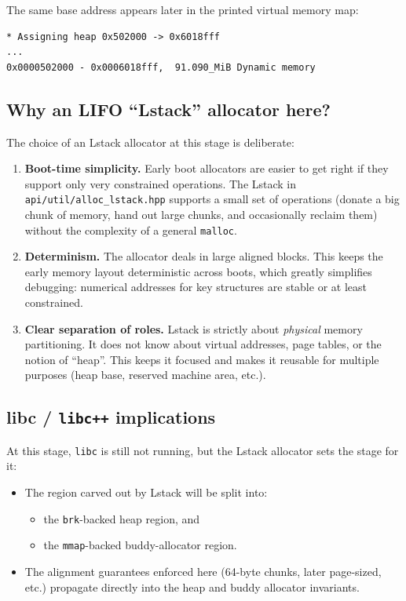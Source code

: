\documentclass[a4paper,11pt]{article}
\begin{document}
The same base address appears later in the printed virtual memory map:

\begin{verbatim}
* Assigning heap 0x502000 -> 0x6018fff
...
0x0000502000 - 0x0006018fff,  91.090_MiB Dynamic memory
\end{verbatim}

\subsection{Why an LIFO “Lstack” allocator here?}

The choice of an Lstack allocator at this stage is deliberate:

\begin{enumerate}
  \item \textbf{Boot-time simplicity.}  
    Early boot allocators are easier to get right if they support only
    very constrained operations. The Lstack in
    \texttt{api/util/alloc\_lstack.hpp} supports a small set of
    operations (donate a big chunk of memory, hand out large chunks, and
    occasionally reclaim them) without the complexity of a general
    \texttt{malloc}.

  \item \textbf{Determinism.}  
    The allocator deals in large aligned blocks. This keeps the early
    memory layout deterministic across boots, which greatly simplifies
    debugging: numerical addresses for key structures are stable or at
    least constrained.

  \item \textbf{Clear separation of roles.}  
    Lstack is strictly about \emph{physical} memory partitioning. It
    does not know about virtual addresses, page tables, or the notion of
    “heap”. This keeps it focused and makes it reusable for multiple
    purposes (heap base, reserved machine area, etc.).
\end{enumerate}

\subsection{libc / \texorpdfstring{\texttt{libc++}}{libc++} implications}

At this stage, \texttt{libc} is still not running, but the Lstack allocator
sets the stage for it:

\begin{itemize}
  \item The region carved out by Lstack will be split into:
    \begin{itemize}
      \item the \texttt{brk}-backed heap region, and
      \item the \texttt{mmap}-backed buddy-allocator region.
    \end{itemize}
  \item The alignment guarantees enforced here (64-byte chunks, later
        page-sized, etc.) propagate directly into the heap and buddy
        allocator invariants.
\end{itemize}
\end{document}
